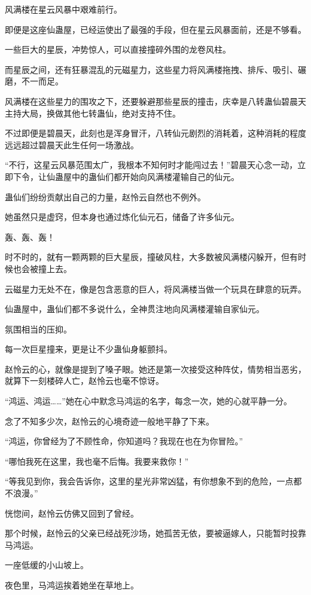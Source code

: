 \begin{this_body}
风满楼在星云风暴中艰难前行。

即便是这座仙蛊屋，已经运使出了最强的手段，但在星云风暴面前，还是不够看。

一些巨大的星辰，冲势惊人，可以直接撞碎外围的龙卷风柱。

而星辰之间，还有狂暴混乱的元磁星力，这些星力将风满楼拖拽、排斥、吸引、碾磨，不一而足。

风满楼在这些星力的围攻之下，还要躲避那些星辰的撞击，庆幸是八转蛊仙碧晨天主持大局，换做其他七转蛊仙，绝对支持不住。

不过即便是碧晨天，此刻也是浑身冒汗，八转仙元剧烈的消耗着，这种消耗的程度远远超过碧晨天此生任何一场激战。

“不行，这星云风暴范围太广，我根本不知何时才能闯过去！”碧晨天心念一动，立即下令，让仙蛊屋中的蛊仙们都开始向风满楼灌输自己的仙元。

蛊仙们纷纷贡献出自己的力量，赵怜云自然也不例外。

她虽然只是虚窍，但本身也通过炼化仙元石，储备了许多仙元。

轰、轰、轰！

时不时的，就有一颗两颗的巨大星辰，撞破风柱，大多数被风满楼闪躲开，但有时候也会被撞上去。

云磁星力无处不在，像是包含恶意的巨人，将风满楼当做一个玩具在肆意的玩弄。

仙蛊屋中，蛊仙们都不多说什么，全神贯注地向风满楼灌输自家仙元。

氛围相当的压抑。

每一次巨星撞来，更是让不少蛊仙身躯颤抖。

赵怜云的心，就像是提到了嗓子眼。她还是第一次接受这种阵仗，情势相当恶劣，就算下一刻楼碎人亡，赵怜云也毫不惊讶。

“鸿运、鸿运……”她在心中默念马鸿运的名字，每念一次，她的心就平静一分。

念了不知多少次，赵怜云的心境奇迹一般地平静了下来。

“鸿运，你曾经为了不顾性命，你知道吗？我现在也在为你冒险。”

“哪怕我死在这里，我也毫不后悔。我要来救你！”

“等我见到你，我会告诉你，这里的星光非常凶猛，有你想象不到的危险，一点都不浪漫。”

恍惚间，赵怜云仿佛又回到了曾经。

那个时候，赵怜云的父亲已经战死沙场，她孤苦无依，要被逼嫁人，只能暂时投靠马鸿运。

一座低缓的小山坡上。

夜色里，马鸿运挨着她坐在草地上。


\end{this_body}
